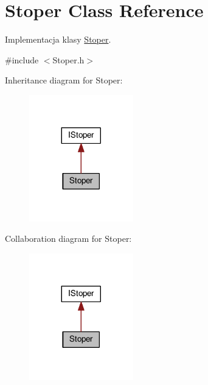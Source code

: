 \hypertarget{class_stoper}{\section{Stoper Class Reference}
\label{class_stoper}
}


Implementacja klasy \hyperlink{class_stoper}{Stoper}.  




{\ttfamily \#include $<$Stoper.\-h$>$}



Inheritance diagram for Stoper\-:
\nopagebreak
\begin{figure}[H]
\begin{center}
\leavevmode
\includegraphics[width=128pt]{class_stoper__inherit__graph}
\end{center}
\end{figure}


Collaboration diagram for Stoper\-:
\nopagebreak
\begin{figure}[H]
\begin{center}
\leavevmode
\includegraphics[width=128pt]{class_stoper__coll__graph}
\end{center}
\end{figure}
